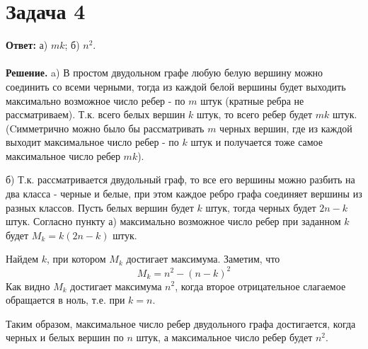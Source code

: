 \documentclass{article}
\begin{document}
\section*{Задача 4}
{\bf Ответ:}  а) $mk$; б) $n^2$.
\\
\\
{\bf Решение.} a) В простом двудольном графе любую белую вершину можно соединить со всеми черными, тогда из каждой белой вершины будет выходить максимально возможное число ребер - по $m$ штук  (кратные ребра не рассматриваем). Т.к. всего белых вершин $k$ штук, то всего ребер будет $mk$ штук. (Cимметрично можно было бы рассматривать $m$ черных вершин, где из каждой выходит максимальное число ребер - по $k$ штук и получается тоже самое максимальное число ребер $mk$).
\par б) Т.к. рассматривается двудольный граф, то все его вершины можно разбить на два класса - черные и белые, при этом каждое ребро графа соединяет вершины из разных классов. Пусть белых вершин будет $k$ штук, тогда черных будет $2n-k$ штук. Согласно пункту а) максимально возможное число ребер при заданном $k$ будет $M_k=k(2n-k)$ штук.
\par
Найдем $k$, при котором $M_k$ достигает максимума. Заметим, что $$M_k=n^2 - (n-k)^2$$
Как видно $M_k$ достигает максимума $n^2$, когда второе отрицательное слагаемое обращается в ноль, т.е. при $k=n$. 
\par
Таким образом, максимальное число ребер двудольного графа достигается, когда черных и белых вершин по $n$ штук, а максимальное число ребер будет $n^2$.
\end{document}
